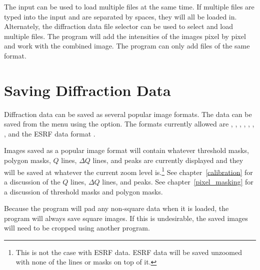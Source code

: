 The  input can be used to load multiple files
at the same time.
If multiple files are typed into the  input and
are separated by spaces, they will all be loaded in. 
Alternately, the diffraction data file 
selector can be used to select and load multiple files.
The program will add the intensities of the images pixel by pixel 
and work with the combined image. The program can only add files 
of the same format.

\section{Saving Diffraction Data}

Diffraction data can be saved as several popular image formats. 
The data can be saved from the  menu using 
the  option. The formats currently allowed are , 
, , , , , , and 
the ESRF data format .

Images saved as a popular image format will contain whatever
threshold masks, polygon masks, $Q$ lines, $\Delta Q$ lines, and peaks 
are currently displayed and they will be saved
at whatever the current zoom level is.\footnote{This is not the case with 
ESRF data. ESRF data will be saved unzoomed with none
of the lines or masks on top of it.} See chapter~\ref{calibration} for 
a discussion of the $Q$ lines, $\Delta Q$ lines, and peaks. See 
chapter~\ref{pixel_masking} for a discussion of threshold masks and 
polygon masks.

Because the program will pad any non-square data when
it is loaded, the program will always save square
images. If this is undesirable, the saved images
will need to be cropped using another program.

